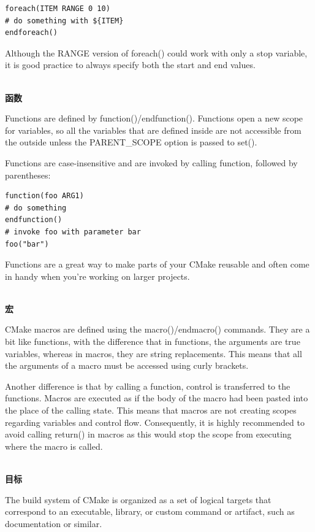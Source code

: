 \begin{lstlisting}[style=styleCMake]
foreach(ITEM RANGE 0 10)
# do something with ${ITEM}
endforeach()
\end{lstlisting}

Although the RANGE version of foreach() could work with only a stop variable, it is good practice to always specify both the start and end values.

\hspace*{\fill} \\ %
\noindent
\textbf{函数}

Functions are defined by function()/endfunction(). Functions open a new scope for variables, so all the variables that are defined inside are not accessible from the outside unless the PARENT\_SCOPE option is passed to set().

Functions are case-insensitive and are invoked by calling function, followed by parentheses:

\begin{lstlisting}[style=styleCMake]
function(foo ARG1)
# do something
endfunction()
# invoke foo with parameter bar
foo("bar")
\end{lstlisting}

Functions are a great way to make parts of your CMake reusable and often come in handy when you're working on larger projects.

\hspace*{\fill} \\ %
\noindent
\textbf{宏}

CMake macros are defined using the macro()/endmacro() commands. They are a
bit like functions, with the difference that in functions, the arguments are true variables, whereas in macros, they are string replacements. This means that all the arguments of a macro must be accessed using curly brackets.

Another difference is that by calling a function, control is transferred to the functions. Macros are executed as if the body of the macro had been pasted into the place of the calling state. This means that macros are not creating scopes regarding variables and control flow. Consequently, it is highly recommended to avoid calling return() in macros as this would stop the scope from executing where the macro is called.

\hspace*{\fill} \\ %
\noindent
\textbf{目标}

The build system of CMake is organized as a set of logical targets that correspond to an executable, library, or custom command or artifact, such as documentation or similar.

